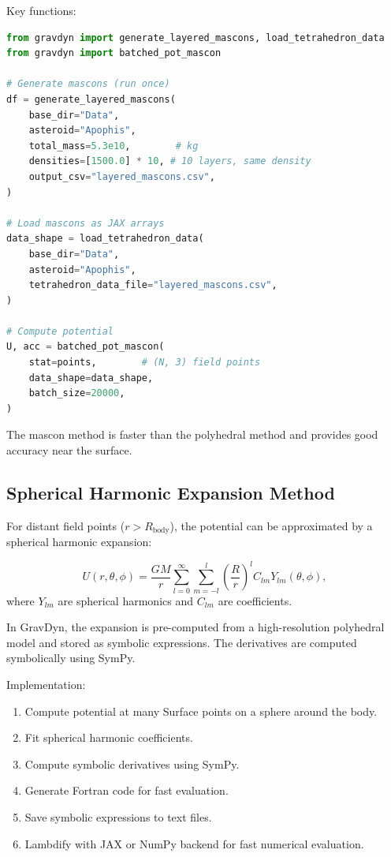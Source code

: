 \documentclass[a4paper,12pt]{article}
\begin{document}
Key functions:

\begin{lstlisting}[language=Python]
from gravdyn import generate_layered_mascons, load_tetrahedron_data
from gravdyn import batched_pot_mascon

# Generate mascons (run once)
df = generate_layered_mascons(
    base_dir="Data",
    asteroid="Apophis",
    total_mass=5.3e10,        # kg
    densities=[1500.0] * 10, # 10 layers, same density
    output_csv="layered_mascons.csv",
)

# Load mascons as JAX arrays
data_shape = load_tetrahedron_data(
    base_dir="Data",
    asteroid="Apophis",
    tetrahedron_data_file="layered_mascons.csv",
)

# Compute potential
U, acc = batched_pot_mascon(
    stat=points,        # (N, 3) field points
    data_shape=data_shape,
    batch_size=20000,
)
\end{lstlisting}

The mascon method is faster than the polyhedral method and provides good accuracy near the surface.

\subsection{Spherical Harmonic Expansion Method}

For distant field points ($r > R_{\text{body}}$), the potential can be approximated by a spherical harmonic expansion:

\begin{equation}
U(r, \theta, \phi) = \frac{GM}{r} \sum_{l=0}^{\infty} \sum_{m=-l}^{l} \left( \frac{R}{r} \right)^l C_{lm} Y_{lm}(\theta, \phi),
\end{equation}
where $Y_{lm}$ are spherical harmonics and $C_{lm}$ are coefficients.

In GravDyn, the expansion is pre-computed from a high-resolution polyhedral model and stored as symbolic expressions. The derivatives are computed symbolically using SymPy.

Implementation:

\begin{enumerate}
    \item Compute potential at many Surface points on a sphere around the body.
    \item Fit spherical harmonic coefficients.
    \item Compute symbolic derivatives using SymPy.
    \item Generate Fortran code for fast evaluation.
    \item Save symbolic expressions to text files.
    \item Lambdify with JAX or NumPy backend for fast numerical evaluation.
\end{enumerate}
\end{document}
